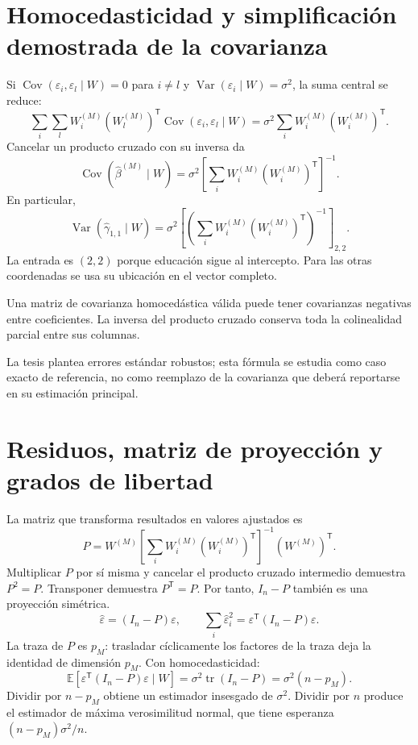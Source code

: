 \documentclass[11pt,a4paper]{article}
\newcommand{\E}{\mathbb E}
\DeclareMathOperator{\Var}{Var}
\DeclareMathOperator{\Cov}{Cov}
\DeclareMathOperator{\tr}{tr}
\begin{document}
\clearpage
\section{Homocedasticidad y simplificación demostrada de la covarianza}

Si $\Cov(\varepsilon_i,\varepsilon_l\mid W)=0$ para $i\ne l$ y $\Var(\varepsilon_i\mid W)=\sigma^2$, la suma central se reduce:
\[
\sum_i\sum_lW_i^{(M)}(W_l^{(M)})^{\mathsf T}
\Cov(\varepsilon_i,\varepsilon_l\mid W)
=\sigma^2\sum_iW_i^{(M)}(W_i^{(M)})^{\mathsf T}.
\]
Cancelar un producto cruzado con su inversa da
\[
\Cov(\widehat\beta^{(M)}\mid W)
=\sigma^2\left[\sum_iW_i^{(M)}(W_i^{(M)})^{\mathsf T}\right]^{-1}.
\]
En particular,
\[
\Var(\widehat\gamma_{1,1}\mid W)
=\sigma^2\left[\left(\sum_iW_i^{(M)}(W_i^{(M)})^{\mathsf T}\right)^{-1}\right]_{2,2}.
\]
La entrada es $(2,2)$ porque educación sigue al intercepto. Para las otras coordenadas se usa su ubicación en el vector completo.

Una matriz de covarianza homocedástica válida puede tener covarianzas negativas entre coeficientes. La inversa del producto cruzado conserva toda la colinealidad parcial entre sus columnas.

La tesis plantea errores estándar robustos; esta fórmula se estudia como caso exacto de referencia, no como reemplazo de la covarianza que deberá reportarse en su estimación principal.

\clearpage
\section{Residuos, matriz de proyección y grados de libertad}

La matriz que transforma resultados en valores ajustados es
\[
P=W^{(M)}
\left[\sum_iW_i^{(M)}(W_i^{(M)})^{\mathsf T}\right]^{-1}
(W^{(M)})^{\mathsf T}.
\]
Multiplicar $P$ por sí misma y cancelar el producto cruzado intermedio demuestra $P^2=P$. Transponer demuestra $P^{\mathsf T}=P$. Por tanto, $I_n-P$ también es una proyección simétrica.
\[
\widehat\varepsilon=(I_n-P)\varepsilon,\qquad
\sum_i\widehat\varepsilon_i^2=\varepsilon^{\mathsf T}(I_n-P)\varepsilon.
\]
La traza de $P$ es $p_M$: trasladar cíclicamente los factores de la traza deja la identidad de dimensión $p_M$. Con homocedasticidad:
\[
\E[\varepsilon^{\mathsf T}(I_n-P)\varepsilon\mid W]
=\sigma^2\tr(I_n-P)=\sigma^2(n-p_M).
\]
Dividir por $n-p_M$ obtiene un estimador insesgado de $\sigma^2$. Dividir por $n$ produce el estimador de máxima verosimilitud normal, que tiene esperanza $(n-p_M)\sigma^2/n$.
\end{document}
